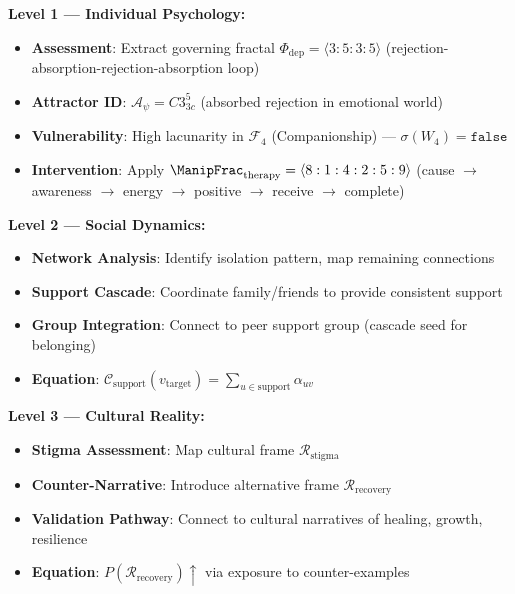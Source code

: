 \documentclass[11pt,twoside]{book}
\newcommand{\Foundations}{\mathcal{F}}
\newcommand{\Frac}{\Phi}
\newcommand{\PsychAttractor}{\mathcal{A}_\psi}
\newcommand{\Cascade}{\mathcal{C}}
\begin{document}
\begin{tcolorbox}[colback=green!5!white,colframe=green!65!black,title=\textbf{Therapeutic Stack Deployment},breakable]

\textbf{Level 1 --- Individual Psychology:}
\begin{itemize}
    \item \textbf{Assessment}: Extract governing fractal $\Frac_{\mathrm{dep}} = \langle 3:5:3:5 \rangle$
          (rejection-absorption-rejection-absorption loop)
    \item \textbf{Attractor ID}: $\PsychAttractor = C3^5_{3c}$ (absorbed rejection in emotional world)
    \item \textbf{Vulnerability}: High lacunarity in $\Foundations_4$ (Companionship) ---
          $\sigma(W_4) = \mathtt{false}$
    \item \textbf{Intervention}: Apply $\ManipFrac_{\mathrm{therapy}} = \langle 8:1:4:2:5:9 \rangle$
          (cause $\to$ awareness $\to$ energy $\to$ positive $\to$ receive $\to$ complete)
\end{itemize}

\textbf{Level 2 --- Social Dynamics:}
\begin{itemize}
    \item \textbf{Network Analysis}: Identify isolation pattern, map remaining connections
    \item \textbf{Support Cascade}: Coordinate family/friends to provide consistent support
    \item \textbf{Group Integration}: Connect to peer support group (cascade seed for belonging)
    \item \textbf{Equation}: $\Cascade_{\mathrm{support}}(v_{\mathrm{target}}) = \sum_{u \in \mathrm{support}} \alpha_{uv}$
\end{itemize}

\textbf{Level 3 --- Cultural Reality:}
\begin{itemize}
    \item \textbf{Stigma Assessment}: Map cultural frame $\mathcal{R}_{\mathrm{stigma}}$
    \item \textbf{Counter-Narrative}: Introduce alternative frame $\mathcal{R}_{\mathrm{recovery}}$
    \item \textbf{Validation Pathway}: Connect to cultural narratives of healing, growth, resilience
    \item \textbf{Equation}: $P(\mathcal{R}_{\mathrm{recovery}}) \uparrow$ via exposure to counter-examples
\end{itemize}


\end{tcolorbox}
\end{document}
